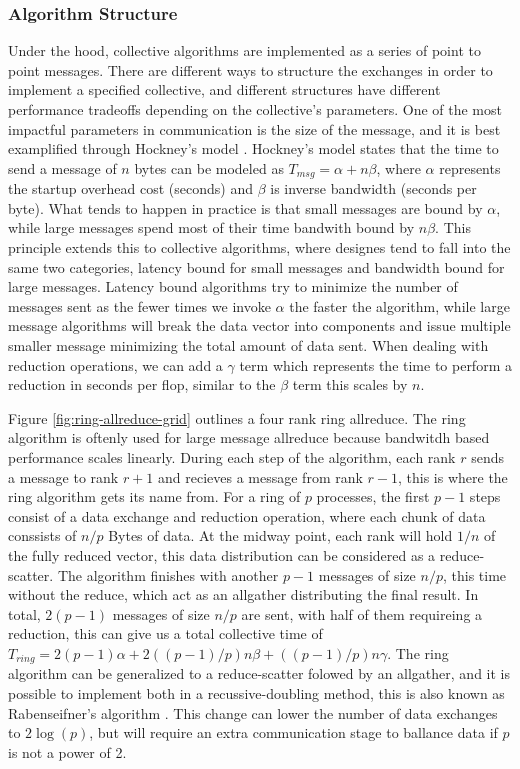 \subsubsection{Algorithm Structure}
Under the hood, collective algorithms are implemented as a series of point to point messages. 
There are different ways to structure the exchanges in order to implement a specified collective, and different structures have different performance tradeoffs depending on the collective's parameters.
One of the most impactful parameters in communication is the size of the message, and it is best examplified through Hockney's model \cite{Hockney1994HockenyModel}.
Hockney's model states that the time to send a message of $n$ bytes can be modeled as $T_{msg}=\alpha+n\beta$, where $\alpha$ represents the startup overhead cost (seconds) and $\beta$ is inverse bandwidth (seconds per byte).
What tends to happen in practice is that small messages are bound by $\alpha$, while large messages spend most of their time bandwith bound by $n\beta$.
This principle extends this to collective algorithms, where designes tend to fall into the same two categories, latency bound for small messages and bandwidth bound for large messages.
Latency bound algorithms try to minimize the number of messages sent as the fewer times we invoke $\alpha$ the faster the algorithm, while large message algorithms will break the data vector into components and issue multiple smaller message minimizing the total amount of data sent.
When dealing with reduction operations, we can add a $\gamma$ term which represents the time to perform a reduction in seconds per flop, similar to the $\beta$ term this scales by $n$.


Figure \ref{fig:ring-allreduce-grid} outlines a four rank ring allreduce.
The ring algorithm is oftenly used for large message allreduce because bandwitdh based performance scales linearly.
During each step of the algorithm, each rank $r$ sends a message to rank $r+1$ and recieves a message from rank $r-1$, this is where the ring algorithm gets its name from.
For a ring of $p$ processes, the first $p-1$ steps consist of a data exchange and reduction operation, where each chunk of data conssists of $n/p$ Bytes of data. 
At the midway point, each rank will hold $1/n$ of the fully reduced vector, this data distribution can be considered as a reduce-scatter.
The algorithm finishes with another $p-1$ messages of size $n/p$, this time without the reduce, which act as an allgather distributing the final result.
In total, $2(p-1)$ messages of size $n/p$ are sent, with half of them requireing a reduction, this can give us a total collective time of $T_{ring} = 2(p-1)\alpha + 2((p-1)/p)n\beta + ((p-1)/p)n\gamma$.
The ring algorithm can be generalized to a reduce-scatter folowed by an allgather, and it is possible to implement both in a recussive-doubling method, this is also known as Rabenseifner's algorithm \cite{Thakur2005OptMPICH}.
This change can lower the number of data exchanges to $2\log(p)$, but will require an extra communication stage to ballance data if $p$ is not a power of 2.

